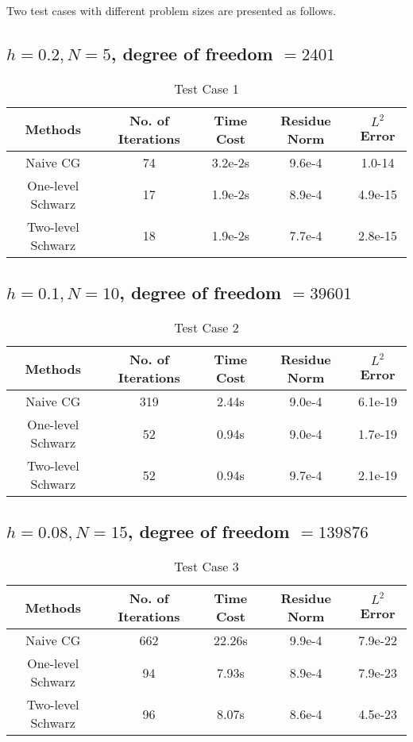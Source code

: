 \documentclass[paper=a4, fontsize=11pt]{scrartcl} %
\begin{document}
Two test cases with different problem sizes are presented as follows.

\subsection{$h=0.2, N=5$, degree of freedom $=2401$}
\begin{table}[H]
\centering
\begin{tabular}{|c|c|c|c|c|}
\hline
Methods & No. of Iterations & Time Cost & Residue Norm & $L^2$ Error\\
\hline
Naive CG &  74 & 3.2e-2s & 9.6e-4 & 1.0-14 \\
\hline
One-level Schwarz & 17 & 1.9e-2s & 8.9e-4 & 4.9e-15 \\
\hline
Two-level Schwarz & 18 & 1.9e-2s & 7.7e-4 & 2.8e-15 \\
\hline
\end{tabular}
\caption{Test Case 1}
\end{table}

\subsection{$h=0.1, N=10$, degree of freedom $=39601$}
\begin{table}[H]
\centering
\begin{tabular}{|c|c|c|c|c|}
\hline
Methods & No. of Iterations & Time Cost & Residue Norm & $L^2$ Error\\
\hline
Naive CG &  319 & 2.44s & 9.0e-4 & 6.1e-19 \\
\hline
One-level Schwarz & 52 & 0.94s & 9.0e-4 & 1.7e-19 \\
\hline
Two-level Schwarz & 52 & 0.94s & 9.7e-4 & 2.1e-19 \\
\hline
\end{tabular}
\caption{Test Case 2}
\end{table}

\subsection{$h=0.08, N=15$, degree of freedom $=139876$}
\begin{table}[H]
\centering
\begin{tabular}{|c|c|c|c|c|}
\hline
Methods & No. of Iterations & Time Cost & Residue Norm & $L^2$ Error\\
\hline
Naive CG &  662 & 22.26s & 9.9e-4 & 7.9e-22 \\
\hline
One-level Schwarz & 94 & 7.93s & 8.9e-4 & 7.9e-23 \\
\hline
Two-level Schwarz & 96 & 8.07s & 8.6e-4 & 4.5e-23 \\
\hline
\end{tabular}
\caption{Test Case 3}
\end{table}
\end{document}
